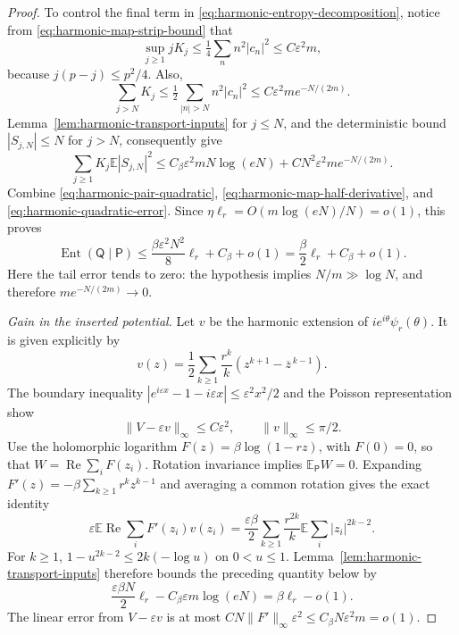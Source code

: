 \documentclass[11pt,a4paper]{article}
\numberwithin{equation}{section}
\theoremstyle{definition}
\theoremstyle{remark}
\begin{document}
\begin{proof}
To control the final term in \eqref{eq:harmonic-entropy-decomposition},
notice from \eqref{eq:harmonic-map-strip-bound} that
\[
 \sup_{j\geq1}jK_j\leq\tfrac14\sum_n n^2|c_n|^2
 \leq C\varepsilon^2m,
\]
because $j(p-j)\leq p^2/4$. Also,
\[
 \sum_{j>N}K_j\leq\tfrac12\sum_{|n|>N}n^2|c_n|^2
 \leq C\varepsilon^2m e^{-N/(2m)}.
\]
Lemma~\ref{lem:harmonic-transport-inputs} for $j\leq N$, and the
deterministic bound $|S_{j,N}|\leq N$ for $j>N$, consequently give
\begin{equation}
 \sum_{j\geq1}K_j\mathbb E|S_{j,N}|^2
 \leq C_\beta\varepsilon^2mN\log(eN)
       +CN^2\varepsilon^2m e^{-N/(2m)}.
 \label{eq:harmonic-quadratic-error}
\end{equation}
Combine \eqref{eq:harmonic-pair-quadratic},
\eqref{eq:harmonic-map-half-derivative}, and
\eqref{eq:harmonic-quadratic-error}. Since
$\eta\ell_r=O(m\log(eN)/N)=o(1)$, this proves
\begin{equation}
 \operatorname{Ent}(\mathsf Q\mid\mathsf P)
 \leq\frac{\beta\varepsilon^2N^2}{8}\ell_r+C_\beta+o(1)
 =\frac\beta2\ell_r+C_\beta+o(1).
 \label{eq:harmonic-entropy-final}
\end{equation}
Here the tail error tends to zero: the hypothesis implies
$N/m\gg\log N$, and therefore $m e^{-N/(2m)}\to0$.

\emph{Gain in the inserted potential.}
Let $v$ be the harmonic extension of $i e^{i\theta}\psi_r(\theta)$.
It is given explicitly by
\[
 v(z)=\frac12\sum_{k\geq1}\frac{r^k}{k}
                   (z^{k+1}-\overline z^{\,k-1}).
\]
The boundary inequality
$|e^{i\varepsilon x}-1-i\varepsilon x|\leq\varepsilon^2x^2/2$
and the Poisson representation show
\begin{equation}
 \|V-\varepsilon v\|_\infty\leq C\varepsilon^2,
 \qquad \|v\|_\infty\leq\pi/2.
 \label{eq:harmonic-map-linearization}
\end{equation}
Use the holomorphic logarithm $F(z)=\beta\log(1-rz)$, with $F(0)=0$,
so that $W=\operatorname{Re}\sum_iF(z_i)$.
Rotation invariance implies $\mathbb E_{\mathsf P}W=0$.
Expanding $F'(z)=-\beta\sum_{k\geq1}r^kz^{k-1}$ and averaging a
common rotation gives the exact identity
\[
 \varepsilon\mathbb E\operatorname{Re}\sum_iF'(z_i)v(z_i)
 =\frac{\varepsilon\beta}{2}
       \sum_{k\geq1}\frac{r^{2k}}k
                     \mathbb E\sum_i|z_i|^{2k-2}.
\]
For $k\geq1$, $1-u^{2k-2}\leq2k(-\log u)$ on $0<u\leq1$.
Lemma~\ref{lem:harmonic-transport-inputs} therefore bounds the preceding
quantity below by
\[
 \frac{\varepsilon\beta N}{2}\ell_r
       -C_\beta\varepsilon m\log(eN)
 =\beta\ell_r-o(1).
\]
The linear error from $V-\varepsilon v$ is at most
$CN\|F'\|_\infty\varepsilon^2\leq C_\beta N\varepsilon^2m=o(1)$.


\end{proof}
\end{document}
